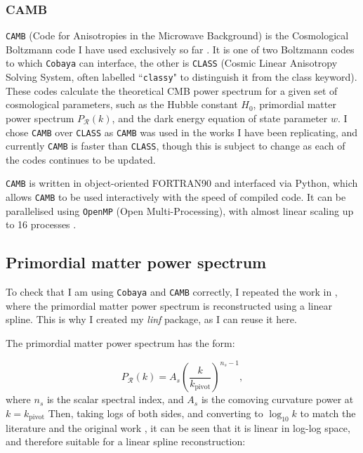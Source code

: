 \documentclass{article}
\begin{document}
\subsubsection{CAMB}
\texttt{CAMB} (Code for Anisotropies in the Microwave Background) is the Cosmological Boltzmann code I have used exclusively so far \cite{CAMB_1, CAMB_2}. It is one of two Boltzmann codes to which \texttt{Cobaya} can interface, the other is \texttt{CLASS} (Cosmic Linear Anisotropy Solving System, often labelled ``\texttt{classy}" to distinguish it from the class keyword). These codes calculate the theoretical CMB power spectrum for a given set of cosmological parameters, such as the Hubble constant $H_0$, primordial matter power spectrum $P_\mathcal R(k)$, and the dark energy equation of state parameter $w$. I chose \texttt{CAMB} over \texttt{CLASS} as \texttt{CAMB} was used in the works I have been replicating, and currently \texttt{CAMB} is faster than \texttt{CLASS}, though this is subject to change as each of the codes continues to be updated.

\texttt{CAMB} is written in object-oriented FORTRAN90 and interfaced via Python, which allows \texttt{CAMB} to be used interactively with the speed of compiled code. It can be parallelised using \texttt{OpenMP} (Open Multi-Processing), with almost linear scaling up to 16 processes \cite{camb_mp}. 

\subsection{Primordial matter power spectrum}
To check that I am using \texttt{Cobaya} and \texttt{CAMB} correctly, I repeated the work in \cite{Handley2019}, where the primordial matter power spectrum is reconstructed using a linear spline. This is why I created my \textit{linf} package, as I can reuse it here.

The primordial matter power spectrum has the form:

\begin{equation}
  P_\mathcal R(k) = A_s \left(\frac{k}{k_\textrm{pivot}} \right) ^ {n_s - 1},
\end{equation}
%
where $n_s$ is the scalar spectral index, and $A_s$ is the comoving curvature power at $k=k_\textrm{pivot}$ Then, taking logs of both sides, and converting to $\log_{10}{k}$ to match the literature and the original work \cite{Handley2019}, it can be seen that it is linear in log-log space, and therefore suitable for a linear spline reconstruction:
\end{document}
